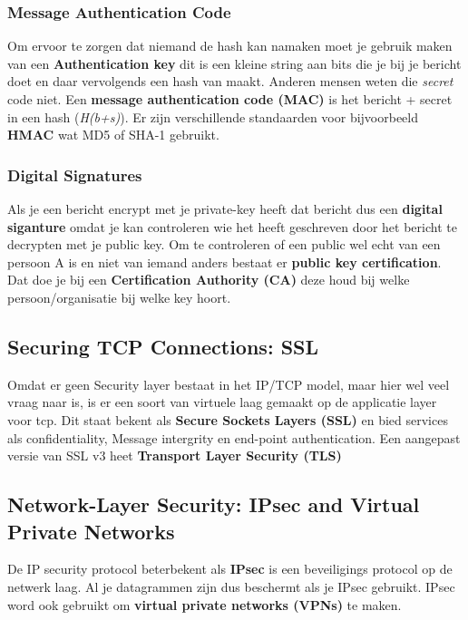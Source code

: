 \subsubsection{Message Authentication Code}
Om ervoor te zorgen dat niemand de hash kan namaken moet je gebruik maken van een \textbf{Authentication key} dit is
een kleine string aan bits die je bij je bericht doet en daar vervolgends een hash van maakt. Anderen mensen weten
die \textit{secret} code niet.
\newline
Een \textbf{message authentication code (MAC)} is het bericht + secret in een hash (\textit{H(b+s)}). Er zijn
verschillende standaarden voor bijvoorbeeld \textbf{HMAC} wat MD5 of SHA-1 gebruikt.

\subsubsection{Digital Signatures}
Als je een bericht encrypt met je private-key heeft dat bericht dus een \textbf{digital siganture} omdat je kan
controleren wie het heeft geschreven door het bericht te decrypten met je public key.
\newline
Om te controleren of een public wel echt van een persoon A is en niet van iemand anders bestaat er \textbf{public key
certification}. Dat doe je bij een \textbf{Certification Authority (CA)} deze houd bij welke persoon/organisatie bij
welke key hoort.

\addtocounter{subsection}{2}
\subsection{Securing TCP Connections: SSL}
Omdat er geen Security layer bestaat in het IP/TCP model, maar hier wel veel vraag naar is, is er een soort van
virtuele laag gemaakt op de applicatie layer voor tcp. Dit staat bekent als \textbf{Secure Sockets Layers (SSL)} en
bied services als confidentiality, Message intergrity en end-point authentication. Een aangepast versie van SSL v3
heet \textbf{Transport Layer Security (TLS)}

\subsection{Network-Layer Security: IPsec and Virtual Private Networks}
De IP security protocol beterbekent als \textbf{IPsec} is een beveiligings protocol op de netwerk laag. Al je
datagrammen zijn dus beschermt als je IPsec gebruikt. IPsec word ook gebruikt om \textbf{virtual private networks
(VPNs)} te maken.
